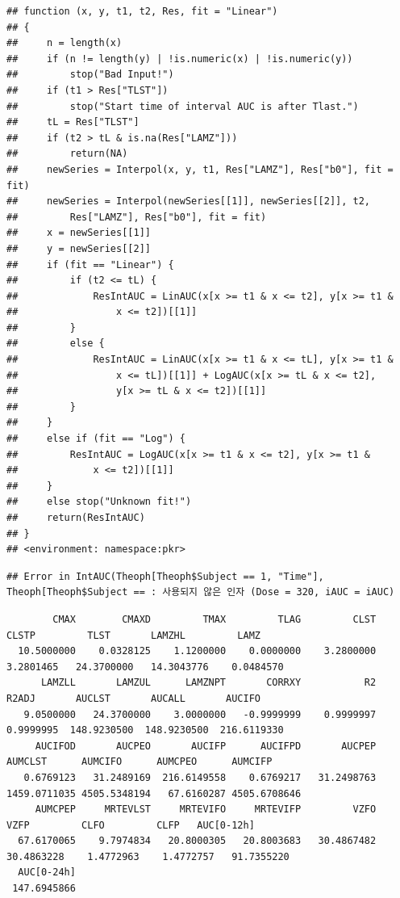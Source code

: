 \documentclass[]{krantz}
\makeatletter
\newenvironment{Shaded}{\begin{snugshade}}{\end{snugshade}}
\newcommand{\KeywordTok}[1]{\textcolor[rgb]{0.13,0.29,0.53}{\textbf{#1}}}
\newcommand{\DataTypeTok}[1]{\textcolor[rgb]{0.13,0.29,0.53}{#1}}
\newcommand{\DecValTok}[1]{\textcolor[rgb]{0.00,0.00,0.81}{#1}}
\newcommand{\StringTok}[1]{\textcolor[rgb]{0.31,0.60,0.02}{#1}}
\newcommand{\OperatorTok}[1]{\textcolor[rgb]{0.81,0.36,0.00}{\textbf{#1}}}
\newcommand{\NormalTok}[1]{#1}
\newenvironment{kframe}{%
\medskip{}
\setlength{\fboxsep}{.8em}
 \def\at@end@of@kframe{}%
 \ifinner\ifhmode%
  \def\at@end@of@kframe{\end{minipage}}%
  \begin{minipage}{\columnwidth}%
 \fi\fi%
 \def\FrameCommand##1{\hskip\@totalleftmargin \hskip-\fboxsep
 \colorbox{shadecolor}{##1}\hskip-\fboxsep
     \hskip-\linewidth \hskip-\@totalleftmargin \hskip\columnwidth}%
 \MakeFramed {\advance\hsize-\width
   \@totalleftmargin\z@ \linewidth\hsize
   \@setminipage}}%
 {\par\unskip\endMakeFramed%
 \at@end@of@kframe}
\renewenvironment{Shaded}{\begin{kframe}}{\end{kframe}}
\theoremstyle{definition}
\theoremstyle{definition}
\theoremstyle{definition}
\theoremstyle{remark}
\makeatother
\begin{document}
\begin{verbatim}
## function (x, y, t1, t2, Res, fit = "Linear") 
## {
##     n = length(x)
##     if (n != length(y) | !is.numeric(x) | !is.numeric(y)) 
##         stop("Bad Input!")
##     if (t1 > Res["TLST"]) 
##         stop("Start time of interval AUC is after Tlast.")
##     tL = Res["TLST"]
##     if (t2 > tL & is.na(Res["LAMZ"])) 
##         return(NA)
##     newSeries = Interpol(x, y, t1, Res["LAMZ"], Res["b0"], fit = fit)
##     newSeries = Interpol(newSeries[[1]], newSeries[[2]], t2, 
##         Res["LAMZ"], Res["b0"], fit = fit)
##     x = newSeries[[1]]
##     y = newSeries[[2]]
##     if (fit == "Linear") {
##         if (t2 <= tL) {
##             ResIntAUC = LinAUC(x[x >= t1 & x <= t2], y[x >= t1 & 
##                 x <= t2])[[1]]
##         }
##         else {
##             ResIntAUC = LinAUC(x[x >= t1 & x <= tL], y[x >= t1 & 
##                 x <= tL])[[1]] + LogAUC(x[x >= tL & x <= t2], 
##                 y[x >= tL & x <= t2])[[1]]
##         }
##     }
##     else if (fit == "Log") {
##         ResIntAUC = LogAUC(x[x >= t1 & x <= t2], y[x >= t1 & 
##             x <= t2])[[1]]
##     }
##     else stop("Unknown fit!")
##     return(ResIntAUC)
## }
## <environment: namespace:pkr>
\end{verbatim}

\begin{Shaded}
\end{Shaded}

\begin{verbatim}
## Error in IntAUC(Theoph[Theoph$Subject == 1, "Time"], Theoph[Theoph$Subject == : 사용되지 않은 인자 (Dose = 320, iAUC = iAUC)
\end{verbatim}

\begin{verbatim}
        CMAX        CMAXD         TMAX         TLAG         CLST        CLSTP         TLST       LAMZHL         LAMZ 
  10.5000000    0.0328125    1.1200000    0.0000000    3.2800000    3.2801465   24.3700000   14.3043776    0.0484570 
      LAMZLL       LAMZUL      LAMZNPT       CORRXY           R2        R2ADJ       AUCLST       AUCALL       AUCIFO 
   9.0500000   24.3700000    3.0000000   -0.9999999    0.9999997    0.9999995  148.9230500  148.9230500  216.6119330 
     AUCIFOD       AUCPEO       AUCIFP      AUCIFPD       AUCPEP      AUMCLST      AUMCIFO      AUMCPEO      AUMCIFP 
   0.6769123   31.2489169  216.6149558    0.6769217   31.2498763 1459.0711035 4505.5348194   67.6160287 4505.6708646 
     AUMCPEP     MRTEVLST     MRTEVIFO     MRTEVIFP         VZFO         VZFP         CLFO         CLFP   AUC[0-12h] 
  67.6170065    9.7974834   20.8000305   20.8003683   30.4867482   30.4863228    1.4772963    1.4772757   91.7355220 
  AUC[0-24h] 
 147.6945866 
\end{verbatim}
\end{document}
